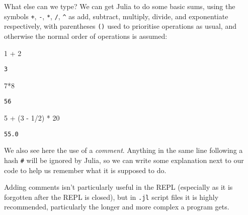 \documentclass[
  letterpaper,
  DIV=11,
  numbers=noendperiod]{scrreprt}
\newenvironment{Shaded}{\begin{snugshade}}{\end{snugshade}}
\newcommand{\FloatTok}[1]{\textcolor[rgb]{0.68,0.00,0.00}{#1}}
\newcommand{\NormalTok}[1]{\textcolor[rgb]{0.00,0.23,0.31}{#1}}
\newcommand{\OperatorTok}[1]{\textcolor[rgb]{0.37,0.37,0.37}{#1}}
\begin{document}
What else can we type? We can get Julia to do some basic sums, using the
symbols \texttt{+}, \texttt{-}, \texttt{*}, \texttt{/}, \texttt{\^{}} as
add, subtract, multiply, divide, and exponentiate respectively, with
parentheses \texttt{()} used to prioritise operations as usual, and
otherwise the normal order of operations is assumed:

\begin{Shaded}
\begin{Highlighting}[]
\FloatTok{1} \OperatorTok{+} \FloatTok{2}
\end{Highlighting}
\end{Shaded}

\begin{verbatim}
3
\end{verbatim}

\begin{Shaded}
\begin{Highlighting}[]
\FloatTok{7}\OperatorTok{*}\FloatTok{8}
\end{Highlighting}
\end{Shaded}

\begin{verbatim}
56
\end{verbatim}

\begin{Shaded}
\begin{Highlighting}[]
\FloatTok{5} \OperatorTok{+}\NormalTok{ (}\FloatTok{3} \OperatorTok{{-}} \FloatTok{1}\OperatorTok{/}\FloatTok{2}\NormalTok{) }\OperatorTok{*} \FloatTok{20}
\end{Highlighting}
\end{Shaded}

\begin{verbatim}
55.0
\end{verbatim}

We also see here the use of a \emph{comment}. Anything in the same line
following a hash \texttt{\#} will be ignored by Julia, so we can write
some explanation next to our code to help us remember what it is
supposed to do.

\begin{tcolorbox}[enhanced jigsaw, toprule=.15mm, opacitybacktitle=0.6, leftrule=.75mm, breakable, coltitle=black, bottomrule=.15mm, colbacktitle=quarto-callout-tip-color!10!white, bottomtitle=1mm, rightrule=.15mm, title=\textcolor{quarto-callout-tip-color}{\faLightbulb}\hspace{0.5em}{Convention}, colframe=quarto-callout-tip-color-frame, left=2mm, colback=white, opacityback=0, arc=.35mm, toptitle=1mm, titlerule=0mm]

Adding comments isn't particularly useful in the REPL (especially as it
is forgotten after the REPL is closed), but in \texttt{.jl} script files
it is highly recommended, particularly the longer and more complex a
program gets.

\end{tcolorbox}
\end{document}
